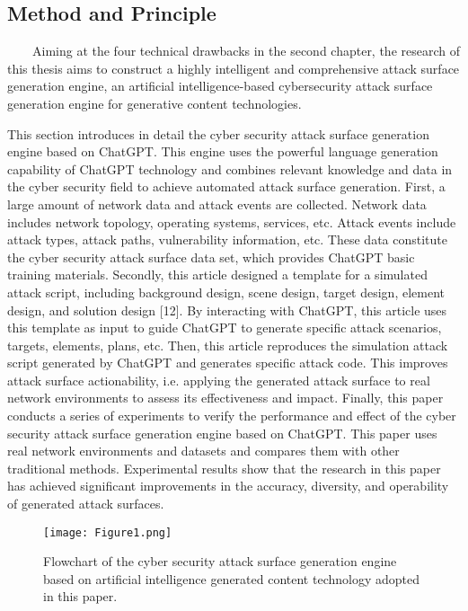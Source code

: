 \documentclass[runningheads]{llncs}
\begin{document}
\subsection{Method and Principle}
\ \ \ \ Aiming at the four technical drawbacks in the second chapter, the research of this thesis aims to construct a highly intelligent and comprehensive attack surface generation engine, an artificial intelligence-based cybersecurity attack surface generation engine for generative content technologies.\par
%
This section introduces in detail the cyber security attack surface generation engine based on ChatGPT. This engine uses the powerful language generation capability of ChatGPT technology and combines relevant knowledge and data in the cyber security field to achieve automated attack surface generation. First, a large amount of network data and attack events are collected. Network data includes network topology, operating systems, services, etc. Attack events include attack types, attack paths, vulnerability information, etc. These data constitute the cyber security attack surface data set, which provides ChatGPT basic training materials. Secondly, this article designed a template for a simulated attack script, including background design, scene design, target design, element design, and solution design [12]. By interacting with ChatGPT, this article uses this template as input to guide ChatGPT to generate specific attack scenarios, targets, elements, plans, etc. Then, this article reproduces the simulation attack script generated by ChatGPT and generates specific attack code. This improves attack surface actionability, i.e. applying the generated attack surface to real network environments to assess its effectiveness and impact. Finally, this paper conducts a series of experiments to verify the performance and effect of the cyber security attack surface generation engine based on ChatGPT. This paper uses real network environments and datasets and compares them with other traditional methods. Experimental results show that the research in this paper has achieved significant improvements in the accuracy, diversity, and operability of generated attack surfaces.\par
%
\begin{figure}[H]
\centering
\texttt{[image: Figure1.png]}
\caption{Flowchart of the cyber security attack surface generation engine based on artificial intelligence generated content technology adopted in this paper.} \label{fig1}
\end{figure}
\vspace{-3em}
%
\end{document}
